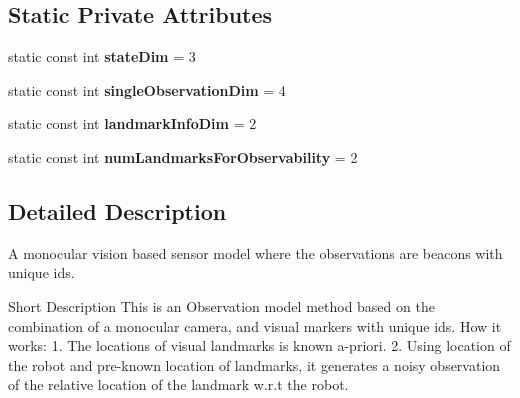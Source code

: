 \subsection*{\-Static \-Private \-Attributes}
\begin{DoxyCompactItemize}
\item 
\hypertarget{class_cam_aruco2_d_observation_model_a88056dea15d6aeaafa5a11e2226eab21}{static const int {\bfseries state\-Dim} = 3}\label{class_cam_aruco2_d_observation_model_a88056dea15d6aeaafa5a11e2226eab21}

\item 
\hypertarget{class_cam_aruco2_d_observation_model_a8cfcef2cce47d94816e6d2692102df6f}{static const int {\bfseries single\-Observation\-Dim} = 4}\label{class_cam_aruco2_d_observation_model_a8cfcef2cce47d94816e6d2692102df6f}

\item 
\hypertarget{class_cam_aruco2_d_observation_model_a0b4eff8ec91d2cae6a2d37495e9541d3}{static const int {\bfseries landmark\-Info\-Dim} = 2}\label{class_cam_aruco2_d_observation_model_a0b4eff8ec91d2cae6a2d37495e9541d3}

\item 
\hypertarget{class_cam_aruco2_d_observation_model_a1750ab1c5ac476d09da804e7a92576f5}{static const int {\bfseries num\-Landmarks\-For\-Observability} = 2}\label{class_cam_aruco2_d_observation_model_a1750ab1c5ac476d09da804e7a92576f5}

\end{DoxyCompactItemize}


\subsection{\-Detailed \-Description}
\-A monocular vision based sensor model where the observations are beacons with unique ids. 

\begin{DoxyParagraph}{\-Short \-Description}
\-This is an \-Observation model method based on the combination of a monocular camera, and visual markers with unique ids. \-How it works\-: 1. \-The locations of visual landmarks is known a-\/priori. 2. \-Using location of the robot and pre-\/known location of landmarks, it generates a noisy observation of the relative location of the landmark w.\-r.\-t the robot. 
\end{DoxyParagraph}


